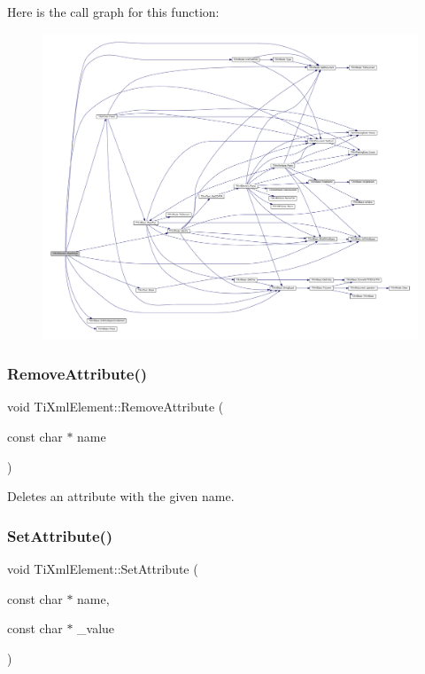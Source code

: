 Here is the call graph for this function\+:\nopagebreak
\begin{figure}[H]
\begin{center}
\leavevmode
\includegraphics[width=350pt]{class_ti_xml_element_ac786bce103042d3837c4cc2ff6967d41_cgraph}
\end{center}
\end{figure}
\mbox{\label{class_ti_xml_element_a56979767deca794376b1dfa69a525b2a}} 
\subsubsection{\texorpdfstring{Remove\+Attribute()}{RemoveAttribute()}}
{\footnotesize\ttfamily void Ti\+Xml\+Element\+::\+Remove\+Attribute (\begin{DoxyParamCaption}\item[{const char $\ast$}]{name }\end{DoxyParamCaption})}

Deletes an attribute with the given name. \mbox{\label{class_ti_xml_element_abf0b3bd7f0e4c746a89ec6e7f101fc32}} 
\subsubsection{\texorpdfstring{Set\+Attribute()}{SetAttribute()}\hspace{0.1cm}{\footnotesize\ttfamily [1/2]}}
{\footnotesize\ttfamily void Ti\+Xml\+Element\+::\+Set\+Attribute (\begin{DoxyParamCaption}\item[{const char $\ast$}]{name,  }\item[{const char $\ast$}]{\+\_\+value }\end{DoxyParamCaption})}

